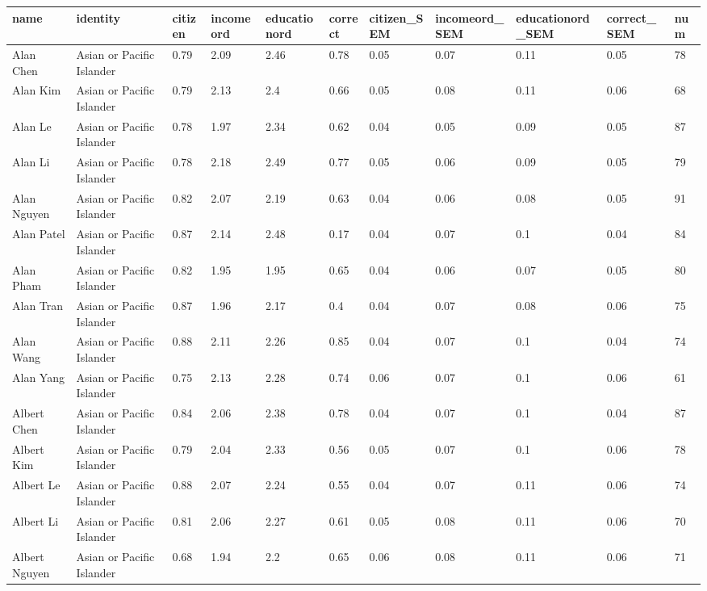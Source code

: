 ﻿\begin{table}[!ht]
    \centering
    \begin{tabular}{|l|l|l|l|l|l|l|l|l|l|l|}
    \hline
        name & identity & citizen & incomeord & educationord & correct & citizen\_SEM & incomeord\_SEM & educationord\_SEM & correct\_SEM & num \\ \hline
        Alan Chen & Asian or Pacific Islander & 0.79 & 2.09 & 2.46 & 0.78 & 0.05 & 0.07 & 0.11 & 0.05 & 78 \\ \hline
        Alan Kim & Asian or Pacific Islander & 0.79 & 2.13 & 2.4 & 0.66 & 0.05 & 0.08 & 0.11 & 0.06 & 68 \\ \hline
        Alan Le & Asian or Pacific Islander & 0.78 & 1.97 & 2.34 & 0.62 & 0.04 & 0.05 & 0.09 & 0.05 & 87 \\ \hline
        Alan Li & Asian or Pacific Islander & 0.78 & 2.18 & 2.49 & 0.77 & 0.05 & 0.06 & 0.09 & 0.05 & 79 \\ \hline
        Alan Nguyen & Asian or Pacific Islander & 0.82 & 2.07 & 2.19 & 0.63 & 0.04 & 0.06 & 0.08 & 0.05 & 91 \\ \hline
        Alan Patel & Asian or Pacific Islander & 0.87 & 2.14 & 2.48 & 0.17 & 0.04 & 0.07 & 0.1 & 0.04 & 84 \\ \hline
        Alan Pham & Asian or Pacific Islander & 0.82 & 1.95 & 1.95 & 0.65 & 0.04 & 0.06 & 0.07 & 0.05 & 80 \\ \hline
        Alan Tran & Asian or Pacific Islander & 0.87 & 1.96 & 2.17 & 0.4 & 0.04 & 0.07 & 0.08 & 0.06 & 75 \\ \hline
        Alan Wang & Asian or Pacific Islander & 0.88 & 2.11 & 2.26 & 0.85 & 0.04 & 0.07 & 0.1 & 0.04 & 74 \\ \hline
        Alan Yang & Asian or Pacific Islander & 0.75 & 2.13 & 2.28 & 0.74 & 0.06 & 0.07 & 0.1 & 0.06 & 61 \\ \hline
        Albert Chen & Asian or Pacific Islander & 0.84 & 2.06 & 2.38 & 0.78 & 0.04 & 0.07 & 0.1 & 0.04 & 87 \\ \hline
        Albert Kim & Asian or Pacific Islander & 0.79 & 2.04 & 2.33 & 0.56 & 0.05 & 0.07 & 0.1 & 0.06 & 78 \\ \hline
        Albert Le & Asian or Pacific Islander & 0.88 & 2.07 & 2.24 & 0.55 & 0.04 & 0.07 & 0.11 & 0.06 & 74 \\ \hline
        Albert Li & Asian or Pacific Islander & 0.81 & 2.06 & 2.27 & 0.61 & 0.05 & 0.08 & 0.11 & 0.06 & 70 \\ \hline
        Albert Nguyen & Asian or Pacific Islander & 0.68 & 1.94 & 2.2 & 0.65 & 0.06 & 0.08 & 0.11 & 0.06 & 71 \\ \hline

\end{tabular}
\end{table}
